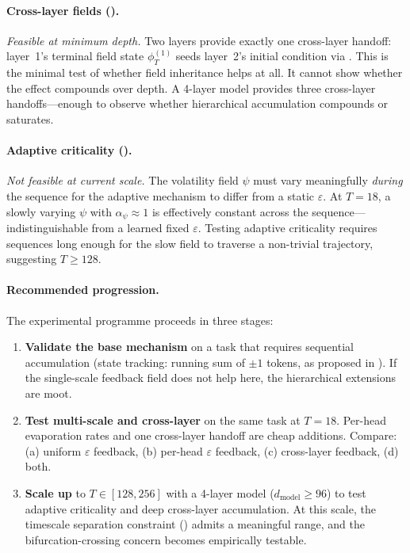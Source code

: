\documentclass[11pt,a4paper]{article}
\newcommand{\evap}{\varepsilon}
\newcommand{\retain}{\alpha}
\begin{document}
\paragraph{Cross-layer fields ().}
\emph{Feasible at minimum depth.}  Two layers provide exactly one
cross-layer handoff: layer~1's terminal field state $\phi_T^{(1)}$
seeds layer~2's initial condition via .
This is the minimal test of whether field inheritance helps at all.
It cannot show whether the effect compounds over depth.  A 4-layer
model provides three cross-layer handoffs---enough to observe whether
hierarchical accumulation compounds or saturates.

\paragraph{Adaptive criticality ().}
\emph{Not feasible at current scale.}  The volatility field $\psi$
must vary meaningfully \emph{during} the sequence for the adaptive
mechanism to differ from a static $\evap$.  At $T = 18$, a slowly
varying $\psi$ with $\retain_\psi \approx 1$ is effectively constant
across the sequence---indistinguishable from a learned fixed
$\evap$.  Testing adaptive criticality requires sequences long enough
for the slow field to traverse a non-trivial trajectory, suggesting
$T \geq 128$.

\paragraph{Recommended progression.}
The experimental programme proceeds in three stages:
\begin{enumerate}
    \item \textbf{Validate the base mechanism} on a task that requires
          sequential accumulation (state tracking: running sum of
          $\pm 1$ tokens, as proposed in ).  If
          the single-scale feedback field does not help here, the
          hierarchical extensions are moot.
    \item \textbf{Test multi-scale and cross-layer} on the same task
          at $T = 18$.  Per-head evaporation rates and one cross-layer
          handoff are cheap additions.  Compare: (a) uniform $\evap$
          feedback, (b) per-head $\evap$ feedback, (c) cross-layer
          feedback, (d) both.
    \item \textbf{Scale up} to $T \in [128, 256]$ with a 4-layer
          model ($d_{\text{model}} \geq 96$) to test adaptive
          criticality and deep cross-layer accumulation.  At this
          scale, the timescale separation
          constraint () admits a
          meaningful range, and the bifurcation-crossing concern
          becomes empirically testable.
\end{enumerate}
\end{document}
